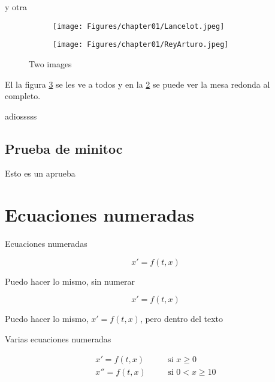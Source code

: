 y otra





\begin{figure}
    \centering
      \begin{subfigure}{0.45\textwidth}
          \caption{}
        \texttt{[image: Figures/chapter01/Lancelot.jpeg]}
          \label{fig:202a}
      \end{subfigure}
      \hfill
      \begin{subfigure}{0.45\textwidth}
          \caption{}
        \texttt{[image: Figures/chapter01/ReyArturo.jpeg]}
          \label{fig:202b}
      \end{subfigure}
\caption{Two images}
\label{fig:202}
\end{figure}


El la figura \ref{fig:202} se les ve a todos y en la  \ref{fig:202b} se puede ver la mesa redonda al completo.



adiosssss

\subsection{Prueba de minitoc}

Esto es un aprueba

\section{Ecuaciones numeradas }


Ecuaciones numeradas

\begin{equation}
x' = f(t,x)
\label{eq:01}
\end{equation}


Puedo hacer lo mismo, sin numerar

$$x' = f(t,x)$$


Puedo hacer lo mismo, $x' = f(t,x)$, pero dentro del texto


Varias  ecuaciones numeradas

\begin{equation}
\begin{array}{lcl}
x' = f(t,x) & \quad & \mbox{si } x \geq 0 \\ 
x'' = f(t,x) & \quad & \mbox{si } 0 < x \geq 10 \\ 
\label{eq:05}
\end{array}
\end{equation}


